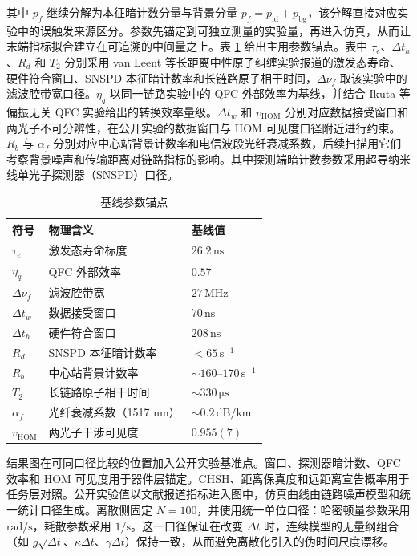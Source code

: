 其中 $p_f$ 继续分解为本征暗计数分量与背景分量
$p_f=p_{\mathrm{id}}+p_{\mathrm{bg}}$，该分解直接对应实验中的误触发来源区分。参数先锚定到可独立测量的实验量，再进入仿真，从而让末端指标拟合建立在可追溯的中间量之上。表 \ref{tab:param-anchor} 给出主用参数锚点。表中 $\tau_e$、$\Delta t_h$、$R_d$ 和 $T_2$ 分别采用 van Leent 等长距离中性原子纠缠实验报道的激发态寿命、硬件符合窗口、SNSPD 本征暗计数率和长链路原子相干时间，$\Delta \nu_f$ 取该实验中的滤波腔带宽口径。$\eta_q$ 以同一链路实验中的 QFC 外部效率为基线，并结合 Ikuta 等偏振无关 QFC 实验给出的转换效率量级。$\Delta t_w$ 和 $v_{\mathrm{HOM}}$ 分别对应数据接受窗口和两光子不可分辨性，在公开实验的数据窗口与 HOM 可见度口径附近进行约束。$R_b$ 与 $\alpha_f$ 分别对应中心站背景计数率和电信波段光纤衰减系数，后续扫描用它们考察背景噪声和传输距离对链路指标的影响\cite{vanleent2022entangling,Ikuta2018PolarizationInsensitiveQFC}。其中探测端暗计数参数采用超导纳米线单光子探测器（SNSPD）口径。
\begin{table}[htbp]
\centering
\caption{基线参数锚点}
\label{tab:param-anchor}
\begin{tabularx}{0.98\linewidth}{l X l}
\toprule
符号 & 物理含义 & 基线值 \\
\midrule
$\tau_e$ & 激发态寿命标度 & $26.2\,\mathrm{ns}$ \\
$\eta_q$ & QFC 外部效率 & $0.57$ \\
$\Delta \nu_f$ & 滤波腔带宽 & $27\,\mathrm{MHz}$ \\
$\Delta t_w$ & 数据接受窗口 & $70\,\mathrm{ns}$ \\
$\Delta t_h$ & 硬件符合窗口 & $208\,\mathrm{ns}$ \\
$R_d$ & SNSPD 本征暗计数率 & $<65\,\mathrm{s^{-1}}$ \\
$R_b$ & 中心站背景计数率 & $\sim 160$--$170\,\mathrm{s^{-1}}$ \\
$T_2$ & 长链路原子相干时间 & $\sim 330\,\mathrm{\mu s}$ \\
$\alpha_f$ & 光纤衰减系数（1517 nm） & $\sim 0.2\,\mathrm{dB/km}$ \\
$v_{\mathrm{HOM}}$ & 两光子干涉可见度 & $0.955(7)$ \\
\bottomrule
\end{tabularx}
\end{table}


结果图在可同口径比较的位置加入公开实验基准点。窗口、探测器暗计数、QFC 效率和 HOM 可见度用于器件层锚定。CHSH、距离保真度和远距离宣告概率用于任务层对照。公开实验值以文献报道指标进入图中，仿真曲线由链路噪声模型和统一统计口径生成。离散侧固定 $N=100$，并使用统一单位口径：哈密顿量参数采用 $\mathrm{rad/s}$，耗散参数采用 $\mathrm{1/s}$。这一口径保证在改变 $\Delta t$ 时，连续模型的无量纲组合（如 $g\sqrt{\Delta t}$、$\kappa \Delta t$、$\gamma \Delta t$）保持一致，从而避免离散化引入的伪时间尺度漂移。

